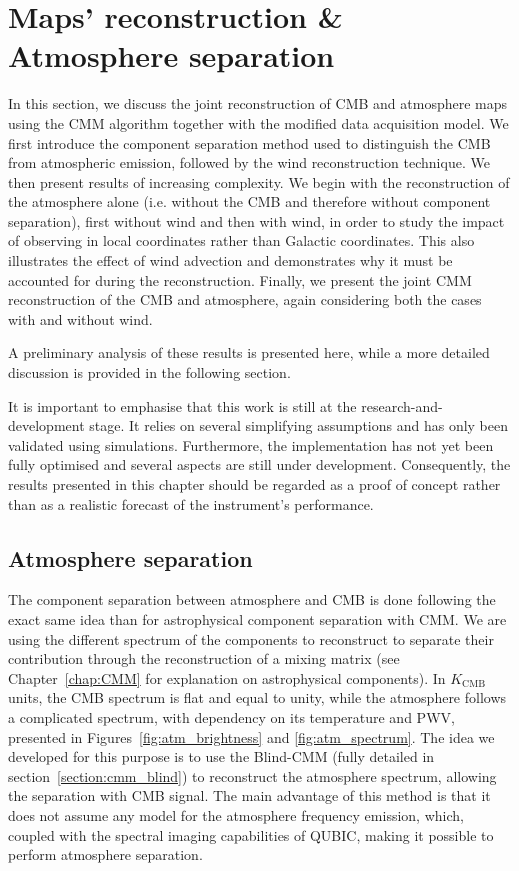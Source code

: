 \documentclass[../../thesis.tex]{subfiles}
\begin{document}
\section{Maps' reconstruction \& Atmosphere separation} \label{section:atm_reconstruction}

In this section, we discuss the joint reconstruction of CMB and atmosphere maps using the CMM algorithm together with the modified data acquisition model.
We first introduce the component separation method used to distinguish the CMB from atmospheric emission, followed by the wind reconstruction technique. We then present results of increasing complexity. We begin with the reconstruction of the atmosphere alone (i.e. without the CMB and therefore without component separation), first without wind and then with wind, in order to study the impact of observing in local coordinates rather than Galactic coordinates. This also illustrates the effect of wind advection and demonstrates why it must be accounted for during the reconstruction. Finally, we present the joint CMM reconstruction of the CMB and atmosphere, again considering both the cases with and without wind.

A preliminary analysis of these results is presented here, while a more detailed discussion is provided in the following section.

It is important to emphasise that this work is still at the research-and-development stage. It relies on several simplifying assumptions and has only been validated using simulations. Furthermore, the implementation has not yet been fully optimised and several aspects are still under development. Consequently, the results presented in this chapter should be regarded as a proof of concept rather than as a realistic forecast of the instrument's performance.

\subsection{Atmosphere separation}

The component separation between atmosphere and CMB is done following the exact same idea than for astrophysical component separation with CMM. We are using the different spectrum of the components to reconstruct to separate their contribution through the reconstruction of a mixing matrix (see Chapter~\ref{chap:CMM} for explanation on astrophysical components). In $K_\text{CMB}$ units, the CMB spectrum is flat and equal to unity, while the atmosphere follows a complicated spectrum, with dependency on its temperature and PWV, presented in Figures~\ref{fig:atm_brightness} and \ref{fig:atm_spectrum}.
The idea we developed for this purpose is to use the Blind-CMM (fully detailed in section~\ref{section:cmm_blind}) to reconstruct the atmosphere spectrum, allowing the separation with CMB signal. The main advantage of this method is that it does not assume any model for the atmosphere frequency emission, which, coupled with the spectral imaging capabilities of QUBIC, making it possible to perform atmosphere separation.
\end{document}
